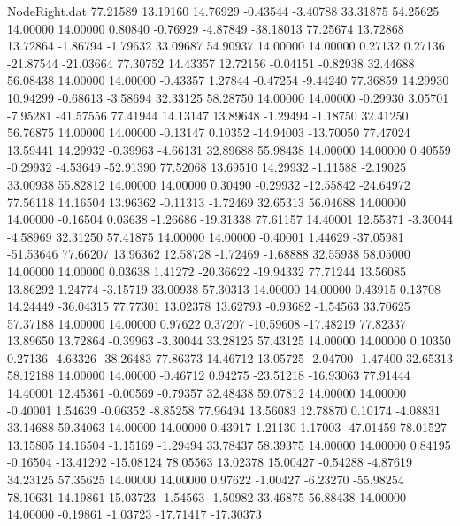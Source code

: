 \begin{filecontents}{NodeRight.dat}
  77.21589   13.19160   14.76929    -0.43544   -3.40788   33.31875   54.25625   14.00000   14.00000    0.80840   -0.76929   -4.87849  -38.18013
  77.25674   13.72868   13.72864    -1.86794   -1.79632   33.09687   54.90937   14.00000   14.00000    0.27132    0.27136  -21.87544  -21.03664
  77.30752   14.43357   12.72156    -0.04151   -0.82938   32.44688   56.08438   14.00000   14.00000   -0.43357    1.27844   -0.47254   -9.44240
  77.36859   14.29930   10.94299    -0.68613   -3.58694   32.33125   58.28750   14.00000   14.00000   -0.29930    3.05701   -7.95281  -41.57556
  77.41944   14.13147   13.89648    -1.29494   -1.18750   32.41250   56.76875   14.00000   14.00000   -0.13147    0.10352  -14.94003  -13.70050
  77.47024   13.59441   14.29932    -0.39963   -4.66131   32.89688   55.98438   14.00000   14.00000    0.40559   -0.29932   -4.53649  -52.91390
  77.52068   13.69510   14.29932    -1.11588   -2.19025   33.00938   55.82812   14.00000   14.00000    0.30490   -0.29932  -12.55842  -24.64972
  77.56118   14.16504   13.96362    -0.11313   -1.72469   32.65313   56.04688   14.00000   14.00000   -0.16504    0.03638   -1.26686  -19.31338
  77.61157   14.40001   12.55371    -3.30044   -4.58969   32.31250   57.41875   14.00000   14.00000   -0.40001    1.44629  -37.05981  -51.53646
  77.66207   13.96362   12.58728    -1.72469   -1.68888   32.55938   58.05000   14.00000   14.00000    0.03638    1.41272  -20.36622  -19.94332
  77.71244   13.56085   13.86292     1.24774   -3.15719   33.00938   57.30313   14.00000   14.00000    0.43915    0.13708   14.24449  -36.04315
  77.77301   13.02378   13.62793    -0.93682   -1.54563   33.70625   57.37188   14.00000   14.00000    0.97622    0.37207  -10.59608  -17.48219
  77.82337   13.89650   13.72864    -0.39963   -3.30044   33.28125   57.43125   14.00000   14.00000    0.10350    0.27136   -4.63326  -38.26483
  77.86373   14.46712   13.05725    -2.04700   -1.47400   32.65313   58.12188   14.00000   14.00000   -0.46712    0.94275  -23.51218  -16.93063
  77.91444   14.40001   12.45361    -0.00569   -0.79357   32.48438   59.07812   14.00000   14.00000   -0.40001    1.54639   -0.06352   -8.85258
  77.96494   13.56083   12.78870     0.10174   -4.08831   33.14688   59.34063   14.00000   14.00000    0.43917    1.21130    1.17003  -47.01459
  78.01527   13.15805   14.16504    -1.15169   -1.29494   33.78437   58.39375   14.00000   14.00000    0.84195   -0.16504  -13.41292  -15.08124
  78.05563   13.02378   15.00427    -0.54288   -4.87619   34.23125   57.35625   14.00000   14.00000    0.97622   -1.00427   -6.23270  -55.98254
  78.10631   14.19861   15.03723    -1.54563   -1.50982   33.46875   56.88438   14.00000   14.00000   -0.19861   -1.03723  -17.71417  -17.30373

\end{filecontents}
